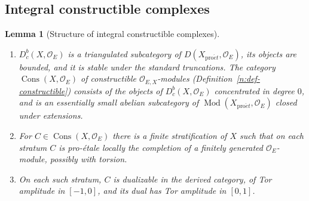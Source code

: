 \documentclass[11pt,a4paper]{article}
\numberwithin{equation}{section}
\newtheorem{lemma}[theorem]{Lemma}
\theoremstyle{definition}
\theoremstyle{remark}
\newcommand{\Dbc}{D^b_c}
\newcommand{\Mod}{\operatorname{Mod}}
\newcommand{\proet}{\mathrm{pro}\acute{e}t}
\newcommand{\Cons}{\operatorname{Cons}}
\begin{document}
\subsection{Integral constructible complexes}

\begin{lemma}[Structure of integral constructible complexes]
\label{i:integral-heart}
\leavevmode
\begin{enumerate}
\item $\Dbc(X,\mathcal O_E)$ is a triangulated subcategory of
  $D(X_{\proet},\mathcal O_E)$, its objects are bounded, and it is stable
  under the standard truncations. The category $\Cons(X,\mathcal O_E)$ of
  constructible $\mathcal O_{E,X}$-modules (Definition~\ref{n:def-constructible})
  consists of the objects of $\Dbc(X,\mathcal O_E)$ concentrated in degree
  $0$, and is an essentially small abelian subcategory of
  $\Mod(X_{\proet},\mathcal O_E)$ closed under extensions.
\item For $C\in\Cons(X,\mathcal O_E)$ there is a finite stratification of
  $X$ such that on each stratum $C$ is pro-\'etale locally the completion
  of a finitely generated $\mathcal O_E$-module, possibly with torsion.
\item On each such stratum, $C$ is dualizable in the derived category,
  of Tor amplitude in $[-1,0]$, and its dual has Tor amplitude in
  $[0,1]$.
\end{enumerate}
\end{lemma}
\end{document}
